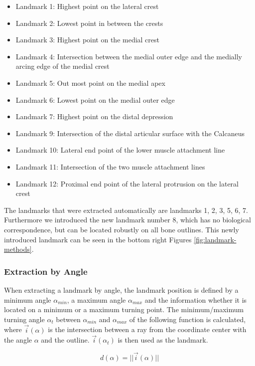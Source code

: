 \documentclass[pdftex,12pt,a4paper]{report}
\begin{document}
\begin{itemize}
\item Landmark 1: Highest point on the lateral crest
\item Landmark 2: Lowest point in between the crests
\item Landmark 3: Highest point on the medial crest
\item Landmark 4: Intersection between the medial outer edge and the medially arcing edge of the medial crest
\item Landmark 5: Out most point on the medial apex
\item Landmark 6: Lowest point on the medial outer edge
\item Landmark 7: Highest point on the distal depression
\item Landmark 9: Intersection of the distal articular surface with the Calcaneus
\item Landmark 10: Lateral end point of the lower muscle attachment line
\item Landmark 11: Intersection of the two muscle attachment lines
\item Landmark 12: Proximal end point of the lateral protrusion on the lateral crest
\end{itemize}

The landmarks that were extracted automatically are landmarks 1, 2, 3, 5, 6, 7. Furthermore we introduced the new
landmark number 8, which has no biological correspondence, but can be located robustly on all bone outlines. This newly introduced landmark can be seen in the bottom right Figures \ref{fig:landmark-methods}.

\subsubsection{Extraction by Angle}

When extracting a landmark by angle, the landmark position is defined by a minimum angle $\alpha_{min}$, a maximum
angle $\alpha_{max}$ and the information whether it is located on a minimum or a maximum turning point.
The minimum/maximum turning angle $\alpha_{t}$ between $\alpha_{min}$ and $\alpha_{max}$ of the following function
is calculated, where $\vec{i}(\alpha)$ is the intersection between a ray from the coordinate center with the angle $\alpha$ and
the outline. $\vec{i}(\alpha_t)$ is then used as the landmark.

\begin{equation}
d(\alpha) = ||\vec{i}(\alpha)||
\end{equation}
\end{document}
